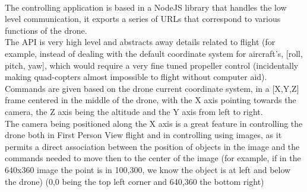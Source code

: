 \documentclass[11pt,twoside,a4paper]{article}
\begin{document}
\paragraph {} The controlling application is based in a NodeJS library that
handles the low level communication, it exports a series of URLs that correspond
to various functions of the drone.\\
The API is very high level and abstracts away details related to flight (for
example, instead of dealing with the default coordinate system for aircraft's,
[roll, pitch, yaw], which would require a very fine tuned propeller control
(incidentally making quad-copters almost impossible to flight without computer
aid). Commands are given based on the drone current coordinate system, in a
[X,Y,Z] frame centered in the middle of the drone, with the X axis pointing
towards the camera, the Z axis being the altitude and the Y axis from left to
right.\\
The camera being positioned along the X axis is a great feature in controlling
the drone both in First Person View flight and in controlling using images, as
it permits a direct association between the position of objects in the image and
the commands needed to move then to the center of the image (for example, if in
the 640x360 image the point is in 100,300, we know the object is at left and
below the drone) (0,0 being the top left corner and 640,360 the bottom right)
\end{document}

